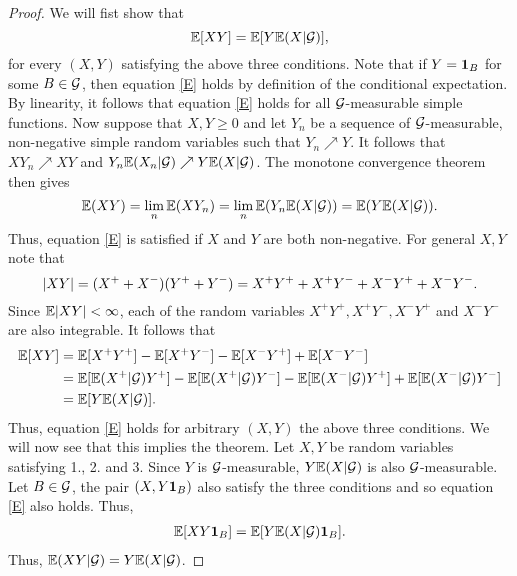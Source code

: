 \begin{proof}
    We will fist show that 
    \begin{equation}\label{E}
        {\mathbb{E}}[XY] = {\mathbb{E}}[Y{\mathbb{E}}(X|{\mathcal{G}})],
    \end{equation} for every $(X,Y)$ satisfying the above three conditions. Note that if $Y = {{\bf 1}}_B$ for some $B \in {\mathcal{G}}$, then equation \eqref{E} holds by definition of the conditional expectation. By linearity, it follows that equation \eqref{E} holds for all ${\mathcal{G}}$-measurable simple functions. Now suppose that $X,Y  \ge 0$ and let $Y_n$ be a sequence of ${\mathcal{G}}$-measurable, non-negative simple random variables such that $Y_n \nearrow Y$. It follows that $XY_n \nearrow XY$ and $Y_n{\mathbb{E}}(X_n|{\mathcal{G}})\nearrow Y{\mathbb{E}}(X|{\mathcal{G}})$. The monotone convergence theorem then gives 
    \[{\mathbb{E}}(XY)=\lim_n {\mathbb{E}}(XY_n) = \lim_n {\mathbb{E}}(Y_n{\mathbb{E}}(X|{\mathcal{G}})) = {\mathbb{E}}(Y{\mathbb{E}}(X|{\mathcal{G}})). \]
    Thus, equation \eqref{E} is satisfied if $X$ and $Y$ are both non-negative. For general $X,Y$ note that 
    \[{\left\lvert XY\right\rvert} = (X^++X^-)(Y^++Y^-) =X^+Y^++X^+Y^-+X^-Y^++X^-Y^-. \]
    Since ${\mathbb{E}}{\left\lvert XY\right\rvert}<\infty$, each of the random variables $X^+Y^+, X^+Y^-, X^-Y^+$ and $X^-Y^-$ are also integrable. It follows that
    \begin{align*}
        {\mathbb{E}}[XY]&={\mathbb{E}}[X^+Y^+]-{\mathbb{E}}[X^+Y^-]-{\mathbb{E}}[X^-Y^+]+{\mathbb{E}}[X^-Y^-]\\
        &={\mathbb{E}}[{\mathbb{E}}(X^+|{\mathcal{G}})Y^+]-{\mathbb{E}}[{\mathbb{E}}(X^+|{\mathcal{G}})Y^-]-{\mathbb{E}}[{\mathbb{E}}(X^-|{\mathcal{G}})Y^+]+{\mathbb{E}}[{\mathbb{E}}(X^-|{\mathcal{G}})Y^-]\\
        &={\mathbb{E}}[Y{\mathbb{E}}(X|{\mathcal{G}})].
    \end{align*}
    Thus, equation \eqref{E} holds for arbitrary $(X,Y)$ the above three conditions. We will now see that this implies the theorem. Let $X,Y$ be random variables satisfying 1., 2. and 3. Since $Y$ is ${\mathcal{G}}$-measurable, $Y{\mathbb{E}}(X|{\mathcal{G}})$ is also ${\mathcal{G}}$-measurable. Let $B \in {\mathcal{G}}$, the pair $(X,Y{{\bf 1}}_B)$ also satisfy the three conditions and so equation \eqref{E} also holds. Thus,
    \begin{align*}
        {\mathbb{E}}[XY{{\bf 1}}_B] = {\mathbb{E}}[Y{\mathbb{E}}(X|{\mathcal{G}}){{\bf 1}}_B].
    \end{align*}
    Thus, ${\mathbb{E}}(XY|{\mathcal{G}}) = Y{\mathbb{E}}(X|{\mathcal{G}})$.
\end{proof}
